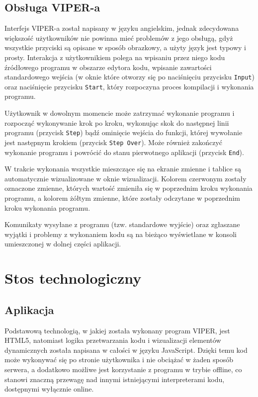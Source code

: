\documentclass[a4paper,twoside,openright,11pt]{report}
\begin{document}
  \section{Obsługa VIPER-a}
\par Interfejs VIPER-a został napisany w języku angielskim, jednak zdecydowana większość użytkowników nie powinna mieć problemów z jego obsługą, gdyż wszystkie przyciski są opisane w sposób obrazkowy, a użyty język jest typowy i prosty. Interakcja z użytkownikiem polega na wpisaniu przez niego kodu źródłowego programu w obszarze edytora kodu, wpisanie zawartości standardowego wejścia (w oknie które otworzy się po naciśnięciu przycisku \texttt{Input}) oraz naciśnięcie przycisku \texttt{Start}, który rozpoczyna proces kompilacji i wykonania programu. 
\par Użytkownik w dowolnym momencie może zatrzymać wykonanie programu i rozpocząć wykonywanie krok po kroku, wykonując skok do następnej linii programu (przycisk \texttt{Step}) bądź ominięcie wejścia do funkcji, której wywołanie jest następnym krokiem (przycisk \texttt{Step Over}). Może również zakończyć wykonanie programu i powrócić do stanu pierwotnego aplikacji (przycisk \texttt{End}).
\par W trakcie wykonania wszystkie mieszczące się na ekranie zmienne i tablice są automatycznie wizualizowane w oknie wizualizacji. Kolorem czerwonym zostały oznaczone zmienne, których wartość zmieniła się w poprzednim kroku wykonania programu, a kolorem żółtym zmienne, które zostały odczytane w poprzednim kroku wykonania programu. 
\par Komunikaty wysyłane z programu (tzw. standardowe wyjście) oraz zgłaszane wyjątki i problemy z wykonaniem kodu są na bieżąco wyświetlane w konsoli umieszczonej w dolnej części aplikacji. 

  \chapter{Stos technologiczny}

  \section{Aplikacja}
\par Podstawową technologią, w jakiej została wykonany program VIPER, jest HTML5, natomiast logika przetwarzania kodu i wizualizacji elementów dynamicznych została napisana w całości w języku JavaScript. Dzięki temu kod może wykonywać się po stronie użytkownika i nie obciążać w żaden sposób serwera, a dodatkowo możliwe jest korzystanie z programu w trybie offline, co stanowi znaczną przewagę nad innymi istniejącymi interpreterami kodu, dostępnymi wyłącznie online.
\end{document}

